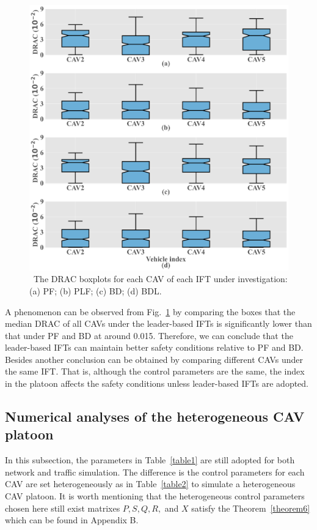 \documentclass[a4paper]{cas-sc}
\begin{document}
\begin{figure}

  \centering
  \includegraphics[width=14cm]{figs/fig8.png}
  \caption{~The DRAC boxplots for each CAV of each IFT under investigation: (a) PF; (b) PLF; (c) BD; (d) BDL.}
  \label{fig8}
\end{figure}
A phenomenon can be observed from Fig.~\ref{fig8} by comparing the boxes that the median DRAC of all CAVs under the leader-based IFTs is significantly lower than that under PF and BD at around 0.015. Therefore, we can conclude that the leader-based IFTs can maintain better safety conditions relative to PF and BD. Besides another conclusion can be obtained by comparing different CAVs under the same IFT. That is, although the control parameters are the same, the index in the platoon affects the safety conditions unless leader-based IFTs are adopted.

\subsection{Numerical analyses of the heterogeneous CAV platoon}
In this subsection, the parameters in Table~\ref{table1} are still adopted for both network and traffic simulation. The difference is the control parameters for each CAV are set heterogeneously as in Table~\ref{table2} to simulate a heterogeneous CAV platoon. It is worth mentioning that the heterogeneous control parameters chosen here still exist matrixes $P,S,Q,R,$ and $X$ satisfy the Theorem~\ref{theorem6} which can be found in Appendix B.
\end{document}
